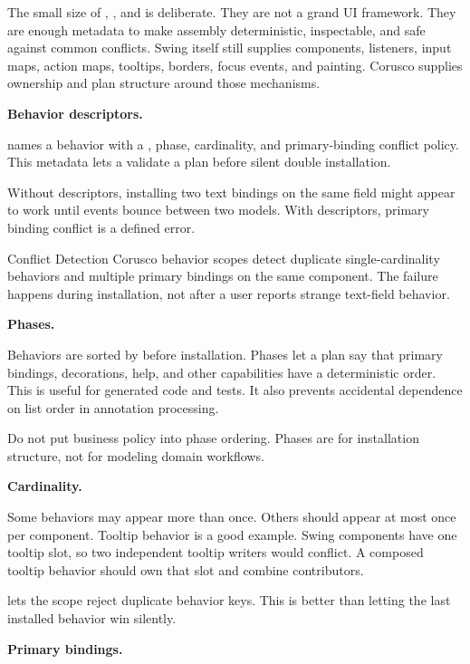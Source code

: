 The small size of , , and
 is deliberate. They are not a grand UI framework. They
are enough metadata to make assembly deterministic, inspectable, and safe
against common conflicts. Swing itself still supplies components, listeners,
input maps, action maps, tooltips, borders, focus events, and painting. Corusco
supplies ownership and plan structure around those mechanisms.

\textbf{Behavior descriptors.}

 names a behavior with a , phase,
cardinality, and primary-binding conflict policy. This metadata lets a
 validate a plan before silent double installation.

Without descriptors, installing two text bindings on the same field might
appear to work until events bounce between two models. With descriptors, primary
binding conflict is a defined error.

\begin{coruscobox}{Conflict Detection}
Corusco behavior scopes detect duplicate single-cardinality behaviors and
multiple primary bindings on the same component. The failure happens during
installation, not after a user reports strange text-field behavior.
\end{coruscobox}

\textbf{Phases.}

Behaviors are sorted by  before installation. Phases let a
plan say that primary bindings, decorations, help, and other capabilities have
a deterministic order. This is useful for generated code and tests. It also
prevents accidental dependence on list order in annotation processing.

Do not put business policy into phase ordering. Phases are for installation
structure, not for modeling domain workflows.

\textbf{Cardinality.}

Some behaviors may appear more than once. Others should appear at most once per
component. Tooltip behavior is a good example. Swing components have one
tooltip slot, so two independent tooltip writers would conflict. A composed
tooltip behavior should own that slot and combine contributors.

 lets the scope reject duplicate behavior keys.
This is better than letting the last installed behavior win silently.

\textbf{Primary bindings.}

